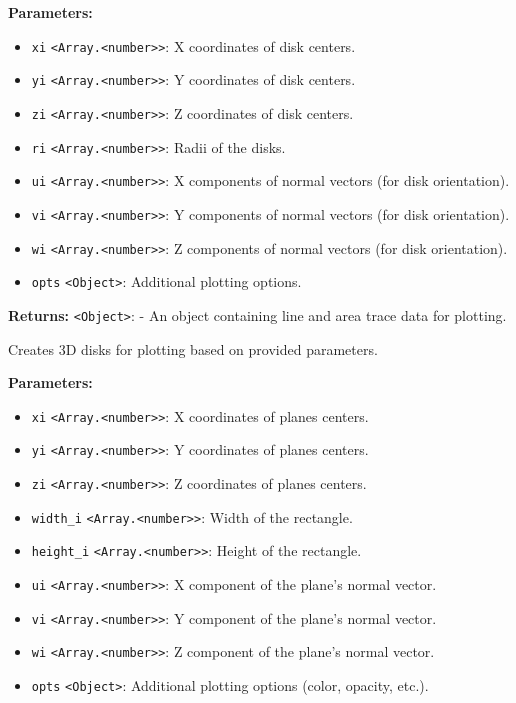 \documentclass[12pt,a4paper]{article}
\begin{document}
\noindent \textbf{Parameters:}
\begin{itemize}
  \item \texttt{xi} \texttt{<Array.<number>>}: X coordinates of disk centers.
  \item \texttt{yi} \texttt{<Array.<number>>}: Y coordinates of disk centers.
  \item \texttt{zi} \texttt{<Array.<number>>}: Z coordinates of disk centers.
  \item \texttt{ri} \texttt{<Array.<number>>}: Radii of the disks.
  \item \texttt{ui} \texttt{<Array.<number>>}: X components of normal vectors (for disk orientation).
  \item \texttt{vi} \texttt{<Array.<number>>}: Y components of normal vectors (for disk orientation).
  \item \texttt{wi} \texttt{<Array.<number>>}: Z components of normal vectors (for disk orientation).
  \item \texttt{opts} \texttt{<Object>}: Additional plotting options.
\end{itemize}

\noindent \textbf{Returns:} \texttt{<Object>}: - An object containing line and area trace data for plotting.

\noindent Creates 3D disks for plotting based on provided parameters.

\vspace{5mm}
\noindent {}


\noindent \textbf{Parameters:}
\begin{itemize}
  \item \texttt{xi} \texttt{<Array.<number>>}: X coordinates of planes centers.
  \item \texttt{yi} \texttt{<Array.<number>>}: Y coordinates of planes centers.
  \item \texttt{zi} \texttt{<Array.<number>>}: Z coordinates of planes centers.
  \item \texttt{width\_i} \texttt{<Array.<number>>}: Width of the rectangle.
  \item \texttt{height\_i} \texttt{<Array.<number>>}: Height of the rectangle.
  \item \texttt{ui} \texttt{<Array.<number>>}: X component of the plane's normal vector.
  \item \texttt{vi} \texttt{<Array.<number>>}: Y component of the plane's normal vector.
  \item \texttt{wi} \texttt{<Array.<number>>}: Z component of the plane's normal vector.
  \item \texttt{opts} \texttt{<Object>}: Additional plotting options (color, opacity, etc.).
\end{itemize}
\end{document}
